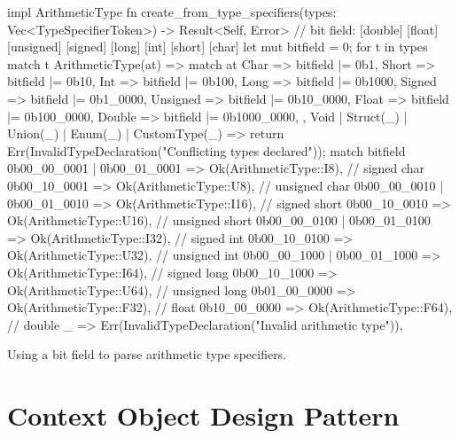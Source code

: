 \documentclass[../00-main.tex]{subfiles}
\begin{document}
\begin{listing}[!t]
  \begin{RustListing}
    impl ArithmeticType {
        fn create_from_type_specifiers(types: Vec<TypeSpecifierToken>) -> Result<Self, Error> {
            // bit field: [double] [float] [unsigned] [signed] [long] [int] [short] [char]
            let mut bitfield = 0;
            for t in types {
                match t {
                    ArithmeticType(at) => match at {
                        Char => bitfield |= 0b1,
                        Short => bitfield |= 0b10,
                        Int => bitfield |= 0b100,
                        Long => bitfield |= 0b1000,
                        Signed => bitfield |= 0b1_0000,
                        Unsigned => bitfield |= 0b10_0000,
                        Float => bitfield |= 0b100_0000,
                        Double => bitfield |= 0b1000_0000,
                    },
                    Void | Struct(_) | Union(_) | Enum(_) | CustomType(_) => {
                        return Err(InvalidTypeDeclaration("Conflicting types declared"));
                    }
                }
            }
            match bitfield {
                0b00_00_0001 | 0b00_01_0001 => Ok(ArithmeticType::I8),  // signed char
                0b00_10_0001 => Ok(ArithmeticType::U8),                 // unsigned char
                0b00_00_0010 | 0b00_01_0010 => Ok(ArithmeticType::I16), // signed short
                0b00_10_0010 => Ok(ArithmeticType::U16),                // unsigned short
                0b00_00_0100 | 0b00_01_0100 => Ok(ArithmeticType::I32), // signed int
                0b00_10_0100 => Ok(ArithmeticType::U32),                // unsigned int
                0b00_00_1000 | 0b00_01_1000 => Ok(ArithmeticType::I64), // signed long
                0b00_10_1000 => Ok(ArithmeticType::U64),                // unsigned long
                0b01_00_0000 => Ok(ArithmeticType::F32),                // float
                0b10_00_0000 => Ok(ArithmeticType::F64),                // double
                _ => Err(InvalidTypeDeclaration("Invalid arithmetic type")),
            }
        }
    }
  \end{RustListing}
  \caption{Using a bit field to parse arithmetic type specifiers.}
  \label{app:lst:arithmetic type bitfield}
\end{listing}



\section{Context Object Design Pattern}\label{app:sec:context object design pattern}
\end{document}
